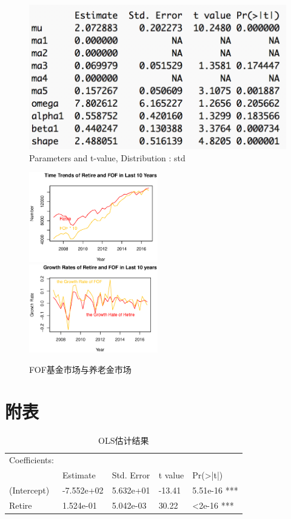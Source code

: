 \documentclass[10.5pt,onecolumn,a4paper]{article}%
\begin{document}
\begin{figure}[h!]
    \begin{center}
    \includegraphics[width=0.7\linewidth]{pic/astgarch}
    \caption{Parameters and t-value,  Distribution    : std }
    \label{fig:astg}
    \end{center}
\end{figure}

\begin{figure}[h!]
    \caption{FOF基金市场与养老金市场} 
    \label{fg:3}
    \includegraphics[width=0.5\textwidth]{3-0-1.eps}
    \includegraphics[width=0.5\textwidth]{3-0-2.eps}
\end{figure}

\section{附表}
\begin{table}[h!]
    \centering
    \caption{OLS估计结果}
    \label{tb:ols}
    \begin{tabular}{l | llll}
        Coefficients: &            &            &         &                     \\
                      & Estimate   & Std. Error & t value & Pr(\textgreater|t|) \\  \hline
        (Intercept)   & -7.552e+02 & 5.632e+01  & -13.41  & 5.51e-16 ***        \\
        Retire        & 1.524e-01  & 5.042e-03  & 30.22   & \textless 2e-16 ***
    \end{tabular}
\end{table}
\end{document}
